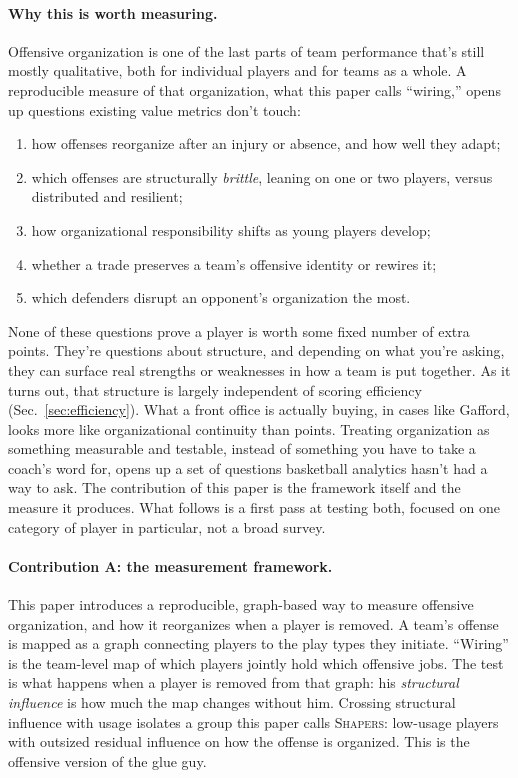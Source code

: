 \documentclass[11pt]{article}
\begin{document}
\paragraph{Why this is worth measuring.}
Offensive organization is one of the last parts of team performance that's still mostly
qualitative, both for individual players and for teams as a whole. A reproducible measure of
that organization, what this paper calls ``wiring,'' opens up questions existing value metrics
don't touch:
\begin{enumerate}[leftmargin=1.6em,itemsep=0.1em]
 \item how offenses reorganize after an injury or absence, and how well they adapt;
 \item which offenses are structurally \emph{brittle}, leaning on one or two players, versus
 distributed and resilient;
 \item how organizational responsibility shifts as young players develop;
 \item whether a trade preserves a team's offensive identity or rewires it;
 \item which defenders disrupt an opponent's organization the most.
\end{enumerate}
None of these questions prove a player is worth some fixed number of extra points. They're
questions about structure, and depending on what you're asking, they can surface real strengths
or weaknesses in how a team is put together.
As it turns out, that structure is largely independent of scoring efficiency
(Sec.~\ref{sec:efficiency}). What a front office is actually buying, in cases like Gafford,
looks more like organizational continuity than points. Treating organization as something
measurable and testable, instead of something you have to take a coach's word for, opens up a
set of questions basketball analytics hasn't had a way to ask. The contribution of this paper
is the framework itself and the measure it produces. What follows is a first pass at testing
both, focused on one category of player in particular, not a broad survey.

\paragraph{Contribution A: the measurement framework.}
This paper introduces a reproducible, graph-based way to measure offensive organization, and
how it reorganizes when a player is removed. A team's offense is mapped as a graph connecting
players to the play types they initiate. ``Wiring'' is the team-level map of which players
jointly hold which offensive jobs. The test is what happens when a player is removed from that
graph: his \emph{structural influence} is how much the map changes without him. Crossing
structural influence with usage isolates a group this paper calls \textsc{Shapers}: low-usage
players with outsized residual influence on how the offense is organized. This is the
offensive version of the glue guy.
\end{document}

